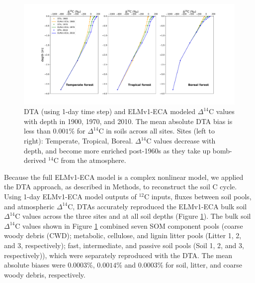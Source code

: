 \documentclass[11pt,a4paper]{article}
\begin{document}
\begin{figure}[htbp]
        \centering 
        \includegraphics[width=1.0\linewidth]{figs/depth_profile_10.pdf}
        \caption{DTA (using 1-day time step) and ELMv1-ECA modeled $\Delta^{14}$C values with depth in 1900, 1970, and 2010. The mean absolute DTA bias is less than $0.001$\% for $\Delta^{14}$C in soils across all sites. Sites (left to right): Temperate, Tropical, Boreal. $\Delta^{14}$C values decrease with depth, and become more enriched post-1960s as they take up bomb-derived $^{14}$C from the atmosphere.
        \label{fig:depthProfiles}
        }
\end{figure}      
             


Because the full ELMv1-ECA model is a complex nonlinear model, we applied the DTA approach, as described in Methods, to reconstruct the soil C cycle. Using 1-day ELMv1-ECA model outputs of $^{12}$C inputs, fluxes between soil pools, and atmospheric $\Delta^{14}$C, DTAs accurately reproduced the ELMv1-ECA bulk soil $\Delta^{14}$C values across the three sites and at all soil depths (Figure \ref{fig:depthProfiles}). The bulk soil $\Delta^{14}$C values shown in Figure \ref{fig:depthProfiles} combined seven SOM component pools (coarse woody debris (CWD); metabolic, cellulose, and lignin litter pools (Litter 1, 2, and 3, respectively); fast, intermediate, and passive soil pools (Soil 1, 2, and 3, respectively)), which were separately reproduced with the DTA. The mean absolute biases were $0.0003$\%, $0.0014$\% and $0.0003$\% for soil, litter, and coarse woody debris, respectively.
\end{document}
